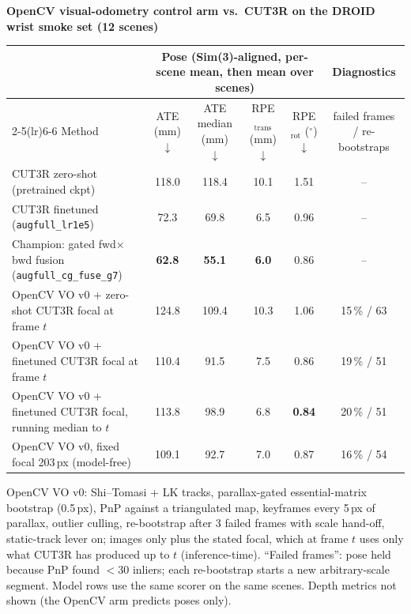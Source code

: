 \documentclass[border=8pt,varwidth=25cm]{standalone}
\begin{document}
\begin{center}
{\normalsize\bfseries OpenCV visual-odometry control arm vs.\ CUT3R on the DROID wrist smoke set (12 scenes)}\par\vspace{8pt}
\footnotesize
\setlength{\tabcolsep}{7pt}
\renewcommand{\arraystretch}{1.15}
\begin{tabular}{lccccc}
\toprule
 & \multicolumn{4}{c}{Pose (Sim(3)-aligned, per-scene mean, then mean over scenes)} & Diagnostics \\
\cmidrule(lr){2-5}\cmidrule(lr){6-6}
Method & ATE (mm) $\downarrow$ & ATE median (mm) $\downarrow$ & RPE$_{\mathrm{trans}}$ (mm) $\downarrow$ & RPE$_{\mathrm{rot}}$ ($^{\circ}$) $\downarrow$ & failed frames / re-bootstraps \\
\midrule
CUT3R zero-shot (pretrained ckpt) & 118.0 & 118.4 & 10.1 & 1.51 & -- \\
CUT3R finetuned (\texttt{augfull\_lr1e5}) & 72.3 & 69.8 & 6.5 & 0.96 & -- \\
Champion: gated fwd$\times$bwd fusion (\texttt{augfull\_cg\_fuse\_g7}) & \textbf{62.8} & \textbf{55.1} & \textbf{6.0} & 0.86 & -- \\
\midrule
OpenCV VO v0 + zero-shot CUT3R focal at frame $t$ & 124.8 & 109.4 & 10.3 & 1.06 & 15\,\% / 63 \\
OpenCV VO v0 + finetuned CUT3R focal at frame $t$ & 110.4 & 91.5 & 7.5 & 0.86 & 19\,\% / 51 \\
OpenCV VO v0 + finetuned CUT3R focal, running median to $t$ & 113.8 & 98.9 & 6.8 & \textbf{0.84} & 20\,\% / 51 \\
OpenCV VO v0, fixed focal 203\,px (model-free) & 109.1 & 92.7 & 7.0 & 0.87 & 16\,\% / 54 \\
\bottomrule
\end{tabular}
\par\vspace{6pt}
\begin{minipage}{0.97\linewidth}\scriptsize
OpenCV VO v0: Shi--Tomasi + LK tracks, parallax-gated essential-matrix bootstrap (0.5\,px), PnP against a
triangulated map, keyframes every 5\,px of parallax, outlier culling, re-bootstrap after 3 failed frames with
scale hand-off, static-track lever on; images only plus the stated focal, which at frame $t$ uses only what CUT3R
has produced up to $t$ (inference-time). ``Failed frames'':
pose held because PnP found $<30$ inliers; each re-bootstrap starts a new arbitrary-scale segment. Model rows
use the same scorer on the same scenes. Depth metrics not shown (the OpenCV arm predicts poses only).
\end{minipage}
\end{center}
\end{document}
